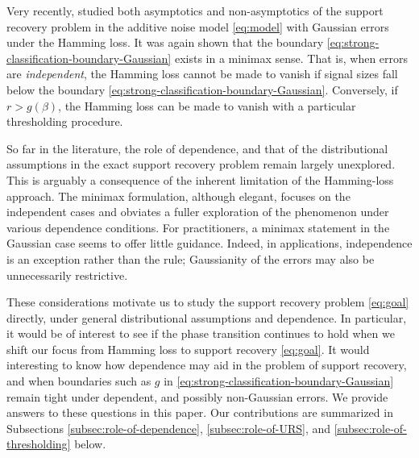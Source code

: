 Very recently, \citet{butucea2018variable} studied both asymptotics and non-asymptotics of the support recovery problem in the additive noise model \eqref{eq:model} with Gaussian errors under the Hamming loss.
It was again shown that the boundary \eqref{eq:strong-classification-boundary-Gaussian} exists in a minimax sense.
That is, when errors are \emph{independent}, the Hamming loss cannot be made to vanish if signal sizes fall below the boundary \eqref{eq:strong-classification-boundary-Gaussian}. 
Conversely, if $r>g(\beta)$, the Hamming loss can be made to vanish with a particular thresholding procedure.


So far in the literature, the role of dependence, and that of the distributional assumptions in the exact support recovery problem remain largely unexplored.  
This is arguably a consequence of the inherent limitation of the Hamming-loss approach. 
The minimax formulation, although elegant, focuses on the independent cases and obviates a fuller exploration of the phenomenon under various dependence conditions.
For practitioners, a minimax statement in the Gaussian case seems to offer little guidance.
Indeed, in applications, independence is an exception rather than the rule; Gaussianity of the errors may also be unnecessarily restrictive.


These considerations motivate us to study the support recovery problem \eqref{eq:goal} directly, under general distributional assumptions and dependence.
In particular, it would be of interest to see if the phase transition continues to hold when we shift our focus from Hamming loss to support recovery \eqref{eq:goal}.
It would interesting to know how dependence may aid in the problem of support recovery, and when boundaries such as $g$ in \eqref{eq:strong-classification-boundary-Gaussian} remain tight under dependent, and possibly non-Gaussian errors.
We provide answers to these questions in this paper. 
Our contributions are summarized in Subsections \ref{subsec:role-of-dependence}, \ref{subsec:role-of-URS}, and \ref{subsec:role-of-thresholding} below.


